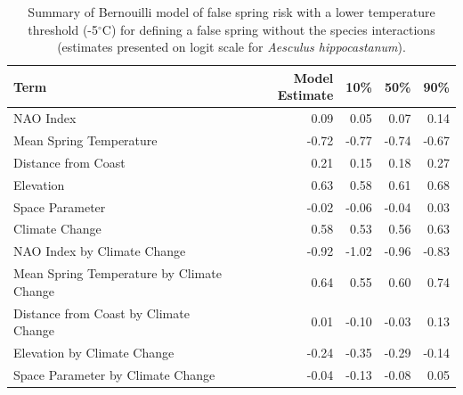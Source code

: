 \documentclass{article}\usepackage[]{graphicx}\usepackage[]{color}
\begin{document}
\begin{table}[H]
\centering
\caption{Summary of Bernouilli model of false spring risk with a lower temperature threshold (-5$^{\circ}$C) for defining a false spring without the species interactions (estimates presented on logit scale for \textit{Aesculus hippocastanum}).} 
\begin{tabular}{lrrrr}
  \hline
Term & Model Estimate & 10\% & 50\% & 90\% \\ 
  \hline
NAO Index & 0.09 & 0.05 & 0.07 & 0.14 \\ 
  Mean Spring 
Temperature & -0.72 & -0.77 & -0.74 & -0.67 \\ 
  Distance from 
Coast & 0.21 & 0.15 & 0.18 & 0.27 \\ 
  Elevation & 0.63 & 0.58 & 0.61 & 0.68 \\ 
  Space Parameter & -0.02 & -0.06 & -0.04 & 0.03 \\ 
  Climate Change & 0.58 & 0.53 & 0.56 & 0.63 \\ 
  NAO Index by Climate Change & -0.92 & -1.02 & -0.96 & -0.83 \\ 
  Mean Spring 
Temperature by Climate Change & 0.64 & 0.55 & 0.60 & 0.74 \\ 
  Distance from 
Coast by Climate Change & 0.01 & -0.10 & -0.03 & 0.13 \\ 
  Elevation by Climate Change & -0.24 & -0.35 & -0.29 & -0.14 \\ 
  Space Parameter by Climate Change & -0.04 & -0.13 & -0.08 & 0.05 \\ 
   \hline
\end{tabular}
\end{table}

  

\end{document}
